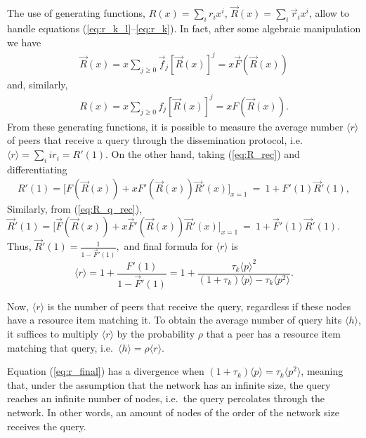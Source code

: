 \documentclass{sig-alternate}
\begin{document}
The use of generating functions, $R(x) = \sum_i r_i x^i$, $\overrightarrow{R}(x) = \sum_i \overrightarrow{r}_i x^i$, allow to handle equations (\ref{eq:r_k_l}--\ref{eq:r_k}). In fact, after some algebraic manipulation we have
\begin{eqnarray}\label{eq:R_q_rec} 
  \overrightarrow{R}(x)  =  x \sum_{j \geq 0} \overrightarrow{f}_j [\overrightarrow{R}(x)]^j
     =  x \overrightarrow{F}(\overrightarrow{R}(x))
\end{eqnarray}
and, similarly,
\begin{eqnarray}\label{eq:R_rec} 
  R(x)  =  x \sum_{j \geq 0} f_j [\overrightarrow{R}(x)]^j
     =  x F(\overrightarrow{R}(x)).
\end{eqnarray}
From these generating functions, 
it is possible
to measure the average number $\langle r \rangle$ of peers that receive a query through the dissemination protocol, i.e.
$\langle r \rangle = \sum_i i r_i = R'(1)$. On the other hand, taking (\ref{eq:R_rec}) and differentiating 
\begin{eqnarray*}\label{eq:r} 
R'(1) = \big[F(\overrightarrow{R}(x)) + x F'(\overrightarrow{R}(x))\overrightarrow{R}'(x)\big]_{x=1}
 \  = \ 1 + F'(1)\overrightarrow{R}'(1),
\end{eqnarray*}
Similarly, from (\ref{eq:R_q_rec}),
$\overrightarrow{R}'(1) = \big[\overrightarrow{F}(\overrightarrow{R}(x)) + x \overrightarrow{F}'(\overrightarrow{R}(x))\overrightarrow{R}'(x)\big]_{x=1}
 \ = \ 1 + \overrightarrow{F}'(1)\overrightarrow{R}'(1).$
Thus,
$\overrightarrow{R}'(1) = \frac{1}{1 - \overrightarrow{F}'(1)},$
and final formula for $\langle r \rangle$ is
\begin{equation}\label{eq:r_final}
\langle r \rangle  =  1 + \frac{F'(1)}{1 - \overrightarrow{F}'(1)}
 =  1 + \frac{\tau_k\langle p \rangle^2}{(1+\tau_k)\langle p \rangle - \tau_k \langle p^2 \rangle}. 
\end{equation}


Now, $\langle r \rangle$ is the number of peers that receive the query, regardless if these nodes have a resource item matching it. To obtain the average number of query hits $\langle h \rangle$, it suffices to multiply $\langle r \rangle$ by the probability $\rho$ that a peer has a resource item matching that query, i.e.~$\langle h \rangle = \rho \langle r \rangle.$


Equation (\ref{eq:r_final}) has a divergence when $(1+\tau_k)\langle p \rangle = \tau_k \langle p^2 \rangle$, meaning that, under the assumption that the network has an infinite size, the query reaches an infinite number of nodes, i.e.~the query percolates through the network.
In other words, an amount of nodes of the order of the network size receives the query.
\end{document}
